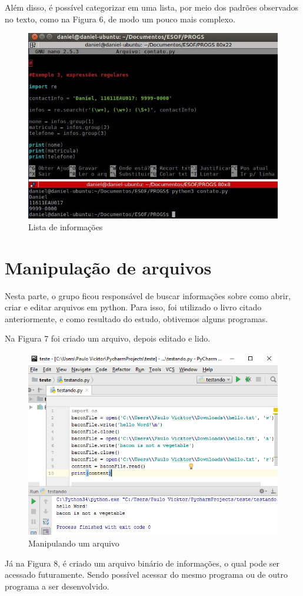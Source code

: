 \documentclass[12pt, a4paper, twocolumn]{article}
\begin{document}
Além disso, é possível categorizar em uma lista, por meio dos padrões observados no texto, como na Figura 6, de modo um pouco mais complexo.

\begin{figure}[htb!]
	\centering
	\includegraphics[scale = 0.35] {re3.jpg}
	\caption{Lista de informações}
\end{figure}
\pagebreak
\section{Manipulação de arquivos}
Nesta parte, o grupo ficou responsável de buscar informações sobre como abrir, criar e editar arquivos em python. Para isso, foi utilizado o livro citado anteriormente, e como resultado do estudo, obtivemos alguns programas.

Na Figura 7 foi criado um arquivo, depois editado e lido.
\begin{figure}[htb!]
	\centering
	\includegraphics[scale = 0.5] {imagem3.png}
	\caption{Manipulando um arquivo}
\end{figure}
\pagebreak
Já na Figura 8, é criado um arquivo binário de informações, o qual pode ser acessado futuramente. Sendo possível acessar do mesmo programa ou de outro programa a ser desenvolvido.
\end{document}
